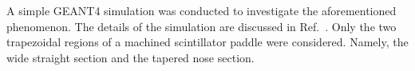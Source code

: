A simple GEANT4 simulation was conducted to investigate the aforementioned phenomenon. The details of the simulation are discussed in Ref.~\cite{pooser16}.  Only the two trapezoidal regions of a machined scintillator paddle were considered.  Namely, the wide straight section and the tapered nose section. %



